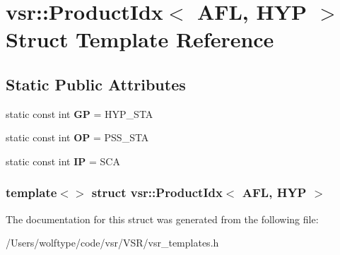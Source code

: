 \hypertarget{structvsr_1_1_product_idx_3_01_a_f_l_00_01_h_y_p_01_4}{\section{vsr\-:\-:Product\-Idx$<$ A\-F\-L, H\-Y\-P $>$ Struct Template Reference}
\label{structvsr_1_1_product_idx_3_01_a_f_l_00_01_h_y_p_01_4}
}
\subsection*{Static Public Attributes}
\begin{DoxyCompactItemize}
\item 
\hypertarget{structvsr_1_1_product_idx_3_01_a_f_l_00_01_h_y_p_01_4_a72b791977b7ed8a52558183d96dc31b1}{static const int {\bfseries G\-P} = H\-Y\-P\-\_\-\-S\-T\-A}\label{structvsr_1_1_product_idx_3_01_a_f_l_00_01_h_y_p_01_4_a72b791977b7ed8a52558183d96dc31b1}

\item 
\hypertarget{structvsr_1_1_product_idx_3_01_a_f_l_00_01_h_y_p_01_4_a2d5da9af8d0e22a5d14eeb367f9fd0cd}{static const int {\bfseries O\-P} = P\-S\-S\-\_\-\-S\-T\-A}\label{structvsr_1_1_product_idx_3_01_a_f_l_00_01_h_y_p_01_4_a2d5da9af8d0e22a5d14eeb367f9fd0cd}

\item 
\hypertarget{structvsr_1_1_product_idx_3_01_a_f_l_00_01_h_y_p_01_4_a99024599b7b146dd9e3ef64f68ac6d21}{static const int {\bfseries I\-P} = S\-C\-A}\label{structvsr_1_1_product_idx_3_01_a_f_l_00_01_h_y_p_01_4_a99024599b7b146dd9e3ef64f68ac6d21}

\end{DoxyCompactItemize}
\subsubsection*{template$<$$>$ struct vsr\-::\-Product\-Idx$<$ A\-F\-L, H\-Y\-P $>$}



The documentation for this struct was generated from the following file\-:\begin{DoxyCompactItemize}
\item 
/\-Users/wolftype/code/vsr/\-V\-S\-R/vsr\-\_\-templates.\-h\end{DoxyCompactItemize}
